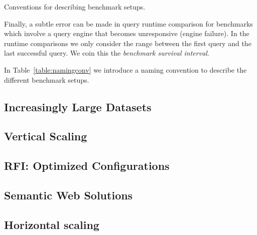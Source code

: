 \begin{table}[ht!]
	\centering
	\caption{Conventions for describing benchmark setups.}
	\label{table:namingconv}
	 \caption*{A description consists of a 3-character prefix describing the RDF storage solution, the number of nodes, the amount of memory and the configuration.}
\end{table}

Finally, a subtle error can be made in query runtime comparison for benchmarks which involve a query engine that becomes unresponsive (engine failure). In the runtime comparisons we only consider the range between the first query and the last successful query. We coin this the \emph{benchmark survival interval}.

In Table~\ref{table:namingconv} we introduce a naming convention to describe the different benchmark setups. 

\subsection{Increasingly Large Datasets}
\label{subsec:bigdata}


\subsection{Vertical Scaling}
\label{subsec:vscaling}


\subsection{RFI: Optimized Configurations}
\label{subsec:rfi}


\subsection{Semantic Web Solutions}
\label{subsec:semweb}


\subsection{Horizontal scaling}
\label{subsec:hscaling}
















